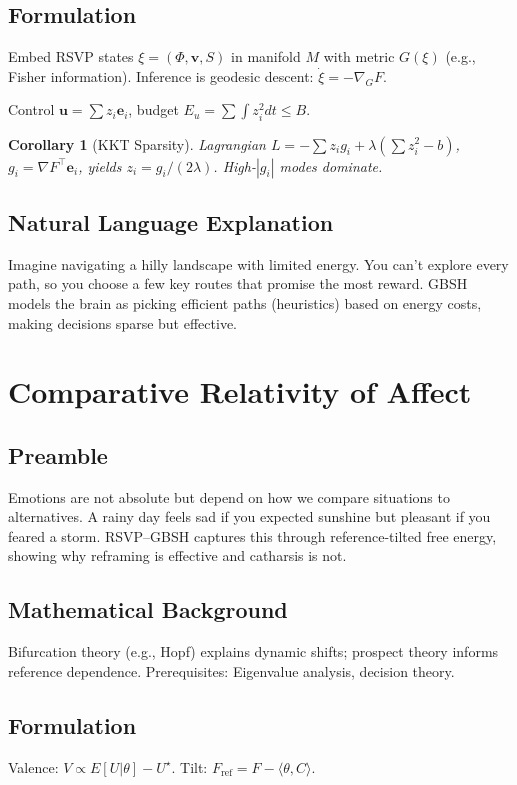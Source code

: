 \documentclass[11pt]{article}
\theoremstyle{plain}
\newtheorem{corollary}{Corollary}
\begin{document}
\subsection{Formulation}
Embed RSVP states \(\xi = (\Phi, \mathbf{v}, S)\) in manifold \(M\) with metric \(G(\xi)\) (e.g., Fisher information). Inference is geodesic descent: \(\dot{\xi} = -\nabla_G F\).

Control \(\mathbf{u} = \sum z_i \mathbf{e}_i\), budget \(E_u = \sum \int z_i^2 dt \leq B\).

\begin{corollary}[KKT Sparsity]
Lagrangian \(L = -\sum z_i g_i + \lambda (\sum z_i^2 - b)\), \(g_i = \nabla F^\top \mathbf{e}_i\), yields \(z_i = g_i / (2\lambda)\). High-\(|g_i|\) modes dominate.
\end{corollary}

\subsection{Natural Language Explanation}
Imagine navigating a hilly landscape with limited energy. You can’t explore every path, so you choose a few key routes that promise the most reward. GBSH models the brain as picking efficient paths (heuristics) based on energy costs, making decisions sparse but effective.

\section{Comparative Relativity of Affect}

\subsection{Preamble}
Emotions are not absolute but depend on how we compare situations to alternatives. A rainy day feels sad if you expected sunshine but pleasant if you feared a storm. RSVP–GBSH captures this through reference-tilted free energy, showing why reframing is effective and catharsis is not.

\subsection{Mathematical Background}
Bifurcation theory (e.g., Hopf) explains dynamic shifts; prospect theory informs reference dependence. Prerequisites: Eigenvalue analysis, decision theory.

\subsection{Formulation}
Valence: \(V \propto E[U|\theta] - U^\star\). Tilt: \(F_{\text{ref}} = F - \langle \theta, C \rangle\).
\end{document}
